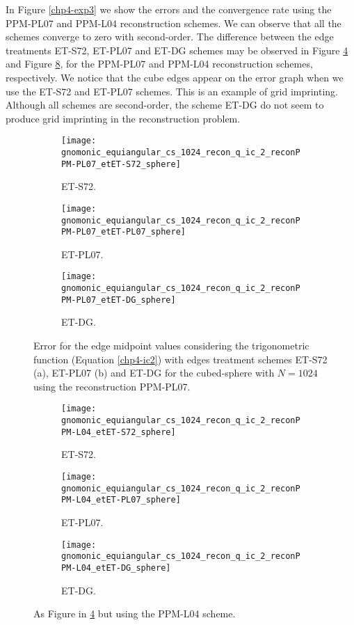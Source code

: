 In Figure \ref{chp4-exp3} we show the errors and the convergence rate using the PPM-PL07 and PPM-L04 reconstruction schemes.
We can observe that all the schemes converge to zero with second-order.
The difference between the edge treatments ET-S72, ET-PL07 and ET-DG schemes
may be observed in Figure \ref{chp4-exp4} and Figure \ref{chp4-exp5}, for the  PPM-PL07 and PPM-L04 reconstruction schemes, respectively.
We notice that the cube edges appear on the error graph when we use the ET-S72 and ET-PL07 schemes. This is an example of grid imprinting.
Although all schemes are second-order, the scheme ET-DG do not seem to produce grid imprinting in the reconstruction problem.
\begin{figure}[!ht]
	\centering
	\begin{subfigure}{0.3\textwidth}
		\centering
		\texttt{[image: gnomonic\_equiangular\_cs\_1024\_recon\_q\_ic\_2\_reconPPM-PL07\_etET-S72\_sphere]}
		\caption{ET-S72.\label{chp4-exp4-a}}
	\end{subfigure}
	\begin{subfigure}{0.3\textwidth}
		\centering
		\texttt{[image: gnomonic\_equiangular\_cs\_1024\_recon\_q\_ic\_2\_reconPPM-PL07\_etET-PL07\_sphere]}
		\caption{ET-PL07.\label{chp4-exp4-b}}
	\end{subfigure}
	\begin{subfigure}{0.3\textwidth}
	\centering
	\texttt{[image: gnomonic\_equiangular\_cs\_1024\_recon\_q\_ic\_2\_reconPPM-PL07\_etET-DG\_sphere]}
	\caption{ET-DG.\label{chp4-exp4-c}}
\end{subfigure}
	\caption{Error for the edge midpoint values considering the trigonometric function (Equation \eqref{chp4-ic2})
	with edges treatment schemes ET-S72 (a), ET-PL07 (b) and ET-DG for the cubed-sphere with $N=1024$ using the reconstruction PPM-PL07.\label{chp4-exp4}}
\end{figure}
\begin{figure}[!ht]
	\centering
	\begin{subfigure}{0.3\textwidth}
		\centering
		\texttt{[image: gnomonic\_equiangular\_cs\_1024\_recon\_q\_ic\_2\_reconPPM-L04\_etET-S72\_sphere]}
		\caption{ET-S72.\label{chp4-exp5-a}}
	\end{subfigure}
	\begin{subfigure}{0.3\textwidth}
		\centering
		\texttt{[image: gnomonic\_equiangular\_cs\_1024\_recon\_q\_ic\_2\_reconPPM-L04\_etET-PL07\_sphere]}
		\caption{ET-PL07.\label{chp4-exp5-b}}
	\end{subfigure}
	\begin{subfigure}{0.3\textwidth}
		\centering
		\texttt{[image: gnomonic\_equiangular\_cs\_1024\_recon\_q\_ic\_2\_reconPPM-L04\_etET-DG\_sphere]}
		\caption{ET-DG.\label{chp4-exp5-c}}
	\end{subfigure}
	\caption{As Figure in \ref{chp4-exp4} but using the PPM-L04 scheme.\label{chp4-exp5}}
\end{figure}

